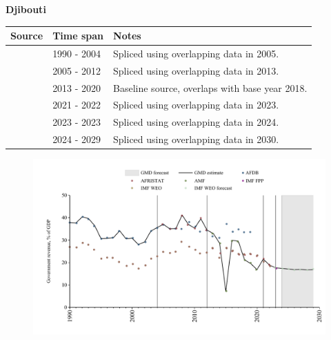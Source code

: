 \documentclass[12pt,a4paper,landscape]{article}
\begin{document}
\begin{adjustbox}{max totalsize={\paperwidth}{\paperheight},center}
\begin{minipage}[t][\textheight][t]{\textwidth}
\vspace*{0.5cm}
{}
\begin{center}
{\Large\bfseries Djibouti}
\end{center}
\vspace{0.5cm}
\begin{table}[H]
\centering
\small
\begin{tabular}{|l|l|l|}
\hline
\textbf{Source} & \textbf{Time span} & \textbf{Notes} \\
\hline
\rowcolor{white}\cite{AFDB}& 1990 - 2004 &Spliced using overlapping data in 2005.\\
\rowcolor{lightgray}\cite{AFRISTAT}& 2005 - 2012 &Spliced using overlapping data in 2013.\\
\rowcolor{white}\cite{AMF}& 2013 - 2020 &Baseline source, overlaps with base year 2018.\\
\rowcolor{lightgray}\cite{AFRISTAT}& 2021 - 2022 &Spliced using overlapping data in 2023.\\
\rowcolor{white}\cite{IMF_FPP}& 2023 - 2023 &Spliced using overlapping data in 2024.\\
\rowcolor{lightgray}\cite{IMF_WEO_forecast}& 2024 - 2029 &Spliced using overlapping data in 2030.\\
\hline
\end{tabular}
\end{table}
\begin{figure}[H]
\centering
\includegraphics[width=\textwidth,height=0.6\textheight,keepaspectratio]{graphs/DJI_govrev_GDP.pdf}
\end{figure}
\end{minipage}
\end{adjustbox}
\end{document}
